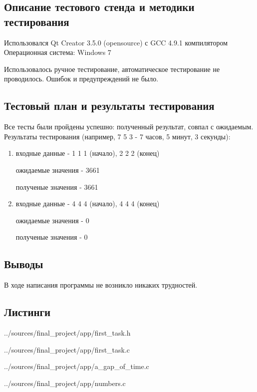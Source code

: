 \documentclass[12pt,a4paper]{report}
\begin{document}
\subsection{Описание тестового стенда и методики тестирования}
Использовался Qt Creator 3.5.0 (opensource) с GCC 4.9.1 компилятором
Операционная система: Windows 7


Использовалось ручное тестирование, автоматическое тестирование не проводилось.
Ошибок и предупреждений не было.

\subsection{Тестовый план и результаты тестирования}

Все тесты были пройдены успешно: полученный результат, совпал с ожидаемым. Результаты тестирования (например,  7 5 3 - 7 часов, 5 минут, 3 секунды):

\begin{enumerate}
\item входные данные - 1 1 1 (начало), 2 2 2 (конец)

ожидаемые значения - 3661

полученые значения - 3661

\item входные данные - 4 4 4 (начало),  4 4 4 (конец)

ожидаемые значения - 0

полученые значения - 0

\end{enumerate}


\subsection{Выводы}

В ходе написания программы не возникло никаких трудностей.

\subsection*{Листинги}

{../sources/final_project/app/first_task.h}

{../sources/final_project/app/first_task.c}

{../sources/final_project/app/a_gap_of_time.c}

{../sources/final_project/app/numbers.c}

\end{document}
